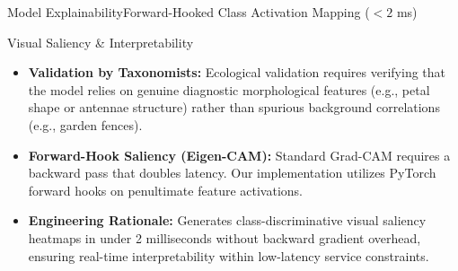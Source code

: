 \begin{frame}{Model Explainability}{Forward-Hooked Class Activation Mapping ($<2$ ms)}
    \begin{block}{Visual Saliency \& Interpretability}
        \begin{itemize}\small
            \item \textbf{Validation by Taxonomists:} Ecological validation requires verifying that the model relies on genuine diagnostic morphological features (e.g., petal shape or antennae structure) rather than spurious background correlations (e.g., garden fences).
            \item \textbf{Forward-Hook Saliency (Eigen-CAM):} Standard Grad-CAM requires a backward pass that doubles latency. Our implementation utilizes PyTorch forward hooks on penultimate feature activations.
            \item \textbf{Engineering Rationale:} Generates class-discriminative visual saliency heatmaps in under 2 milliseconds without backward gradient overhead, ensuring real-time interpretability within low-latency service constraints.
        \end{itemize}
    \end{block}

    \vspace{0.1cm}
    \statusdone

\end{frame}

